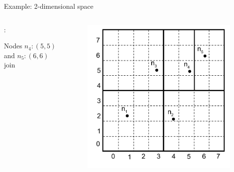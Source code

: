 \begin{frame}{Example: 2-dimensional space}

\begin{columns}
\begin{column}{0.5\textwidth}
:\\
\BI
\item Nodes $n_4:(5, 5)$ and $n_5:(6,6)$ join
\EI
\end{column}
\begin{column}{0.5\textwidth}
\begin{figure}
	\includegraphics[width=1.0\textwidth]{figs/10/can4}
\end{figure}
\end{column}
\end{columns}
		
\end{frame}	


